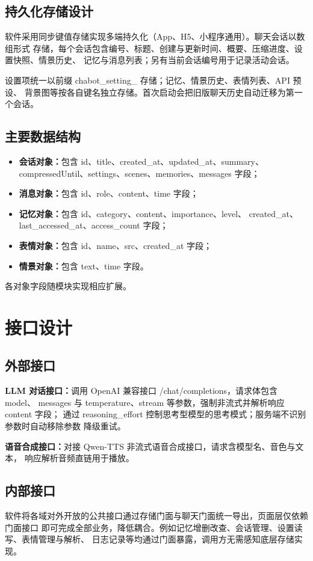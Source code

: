 \documentclass[zihao=5,a4paper]{ctexart}
\begin{document}
\subsection{持久化存储设计}
软件采用同步键值存储实现多端持久化（App、H5、小程序通用）。聊天会话以数组形式
存储，每个会话包含编号、标题、创建与更新时间、概要、压缩进度、设置快照、情景历史、
记忆与消息列表；另有当前会话编号用于记录活动会话。

设置项统一以前缀 chabot\_setting\_ 存储；记忆、情景历史、表情列表、API 预设、
背景图等按各自键名独立存储。首次启动会把旧版聊天历史自动迁移为第一个会话。

\subsection{主要数据结构}
\begin{itemize}[itemsep=0pt,parsep=0pt]
  \item \textbf{会话对象：}包含 id、title、created\_at、updated\_at、summary、
        compressedUntil、settings、scenes、memories、messages 字段；
  \item \textbf{消息对象：}包含 id、role、content、time 字段；
  \item \textbf{记忆对象：}包含 id、category、content、importance、level、
        created\_at、last\_accessed\_at、access\_count 字段；
  \item \textbf{表情对象：}包含 id、name、src、created\_at 字段；
  \item \textbf{情景对象：}包含 text、time 字段。
\end{itemize}
各对象字段随模块实现相应扩展。

\section{接口设计}

\subsection{外部接口}
\textbf{LLM 对话接口：}调用 OpenAI 兼容接口 /chat/completions，请求体包含 model、
messages 与 temperature、stream 等参数，强制非流式并解析响应 content 字段；
通过 reasoning\_effort 控制思考型模型的思考模式；服务端不识别参数时自动移除参数
降级重试。

\textbf{语音合成接口：}对接 Qwen-TTS 非流式语音合成接口，请求含模型名、音色与文本，
响应解析音频直链用于播放。

\subsection{内部接口}
软件将各域对外开放的公共接口通过存储门面与聊天门面统一导出，页面层仅依赖门面接口
即可完成全部业务，降低耦合。例如记忆增删改查、会话管理、设置读写、表情管理与解析、
日志记录等均通过门面暴露，调用方无需感知底层存储实现。
\end{document}
